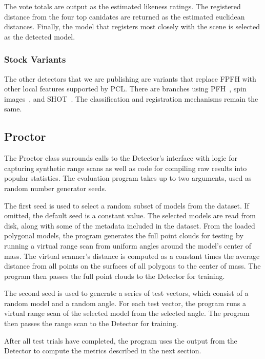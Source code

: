 The vote totals are output as the estimated likeness ratings.
The registered distance from the four top canidates are returned as the estimated euclidean distances.
Finally, the model that registers most closely with the scene is selected as the detected model.

\subsubsection{Stock Variants}
The other detectors that we are publishing are variants that replace FPFH with other local features supported by PCL. There are branches using PFH~\cite{pfh1, pfh2}, spin images~\cite{SpinImages}, and SHOT~\cite{shot}.
The classification and registration mechanisms remain the same.

\subsection{Proctor}
The Proctor class surrounds calls to the Detector's interface with logic for capturing synthetic range scans as well as code for compiling raw results into popular statistics.
The evaluation program takes up to two arguments, used as random number generator seeds.

The first seed is used to select a random subset of models from the dataset. If omitted, the default seed is a constant value.
The selected models are read from disk, along with some of the metadata included in the dataset.
From the loaded polygonal models, the program generates the full point clouds for testing by running a virtual range scan from uniform angles around the model's center of mass.
The virtual scanner's distance is computed as a constant times the average distance from all points on the surfaces of all polygons to the center of mass.
The program then passes the full point clouds to the Detector for training.

The second seed is used to generate a series of test vectors, which consist of a random model and a random angle.
For each test vector, the program runs a virtual range scan of the selected model from the selected angle.
The program then passes the range scan to the Detector for training.

After all test trials have completed, the program uses the output from the Detector to compute the metrics described in the next section.
